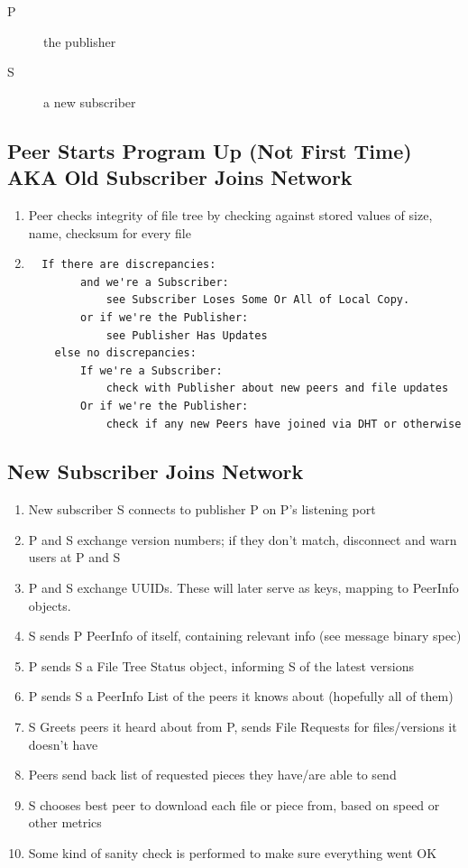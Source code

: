 \documentclass[12pt,a4paper,]{adreport}
\begin{document}
\begin{description}
\item[P]
the publisher
\item[S]
a new subscriber
\end{description}

\subsection{Peer Starts Program Up (Not First Time) AKA Old Subscriber
Joins
Network}\label{peer-starts-program-up-not-first-time-aka-old-subscriber-joins-network}

\begin{enumerate}
\def\labelenumi{\arabic{enumi}.}
\item
  Peer checks integrity of file tree by checking against stored values
  of size, name, checksum for every file
\item
\begin{verbatim}
  If there are discrepancies:
        and we're a Subscriber:
            see Subscriber Loses Some Or All of Local Copy.
        or if we're the Publisher:
            see Publisher Has Updates
    else no discrepancies:
        If we're a Subscriber:
            check with Publisher about new peers and file updates
        Or if we're the Publisher:
            check if any new Peers have joined via DHT or otherwise
\end{verbatim}
\end{enumerate}

\subsection{New Subscriber Joins
Network}\label{new-subscriber-joins-network}

\begin{enumerate}
\def\labelenumi{\arabic{enumi}.}
\itemsep1pt\parskip0pt
\item
  New subscriber S connects to publisher P on P's listening port
\item
  P and S exchange version numbers; if they don't match, disconnect and
  warn users at P and S
\item
  P and S exchange UUIDs. These will later serve as keys, mapping to
  PeerInfo objects.
\item
  S sends P PeerInfo of itself, containing relevant info (see message
  binary spec)
\item
  P sends S a File Tree Status object, informing S of the latest
  versions
\item
  P sends S a PeerInfo List of the peers it knows about (hopefully all
  of them)
\item
  S Greets peers it heard about from P, sends File Requests for
  files/versions it doesn't have
\item
  Peers send back list of requested pieces they have/are able to send
\item
  S chooses best peer to download each file or piece from, based on
  speed or other metrics
\item
  Some kind of sanity check is performed to make sure everything went OK
\end{enumerate}
\end{document}
